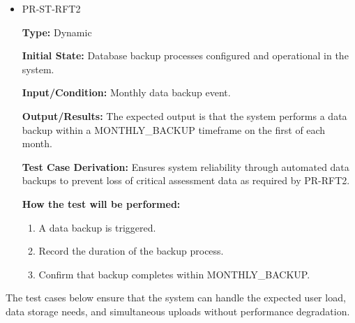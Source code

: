 \documentclass[12pt, titlepage]{article}
\begin{document}
\begin{itemize}
  \item PR-ST-RFT2
  \begin{mdframed}[linewidth=0.5mm]
      \textbf{Type:} Dynamic \par
      \textbf{Initial State:} Database backup processes configured and operational in the system. \par
      \textbf{Input/Condition:} Monthly data backup event. \par
      \textbf{Output/Results:} The expected output is that the system performs a data backup within a MONTHLY\_BACKUP timeframe on the first of each month. \par
      \textbf{Test Case Derivation:} Ensures system reliability through automated data backups to prevent loss of critical assessment data as required by PR-RFT2. \par
      \textbf{How the test will be performed:}
      \begin{enumerate}[noitemsep]
        \item A data backup is triggered.
        \item Record the duration of the backup process.
        \item Confirm that backup completes within MONTHLY\_BACKUP.
      \end{enumerate}
  \end{mdframed}
\end{itemize}

\vspace{1em}
\hspace{2em}The test cases below ensure that the system can handle the expected user load, data storage needs, and simultaneous uploads without performance degradation.
\end{document}
